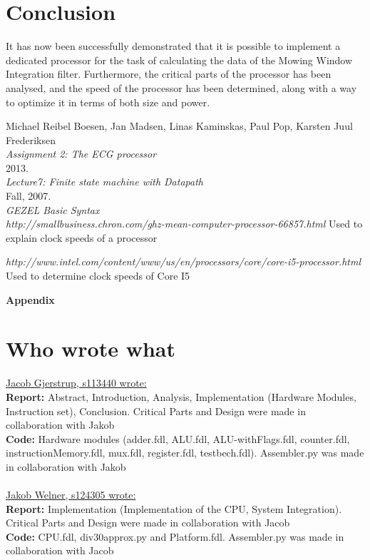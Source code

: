 \documentclass[12pt,a4paper]{article}
\begin{document}
\section{Conclusion}
It has now been successfully demonstrated that it is possible to implement a dedicated processor for the task of calculating the data of the Mowing Window Integration filter. Furthermore, the critical parts of the processor has been analysed, and the speed of the processor has been determined, along with a way to optimize it in terms of both size and power.
\newpage
\begin{thebibliography}{9}

  Michael Reibel Boesen, Jan Madsen, Linas Kaminskas, Paul Pop, Karsten Juul Frederiksen\\
  \emph{Assignment 2: The ECG processor}\\
  2013.\\

  \emph{Lecture7: Finite state machine with Datapath}\\
  Fall, 2007.\\

  \emph{GEZEL Basic Syntax}\\
  
  \emph{http://smallbusiness.chron.com/ghz-mean-computer-processor-66857.html}
  Used to explain clock speeds of a processor
  
  \emph{http://www.intel.com/content/www/us/en/processors/core/core-i5-processor.html}
  Used to determine clock speeds of Core I5
\end{thebibliography}
	
\newpage	
	\begin{Large}
		\textbf{Appendix}
	\end{Large}
	\appendix

\section{Who wrote what}
\underline{Jacob Gjerstrup, s113440 wrote:}\\
\textbf{Report:} Abstract, Introduction, Analysis, Implementation (Hardware Modules, Instruction set), Conclusion. Critical Parts and Design were made in collaboration with Jakob \\
\textbf{Code:} Hardware modules (adder.fdl, ALU.fdl, ALU-withFlags.fdl, counter.fdl, instructionMemory.fdl, mux.fdl, register.fdl, testbech.fdl). Assembler.py was made in collaboration with Jakob\\
\\
\underline{Jakob Welner, s124305 wrote:} \\
\textbf{Report:} Implementation (Implementation of the CPU, System Integration). Critical Parts and Design were made in collaboration with Jacob \\
\textbf{Code:} CPU.fdl, div30approx.py and Platform.fdl. Assembler.py was made in collaboration with Jacob\\
\end{document}
